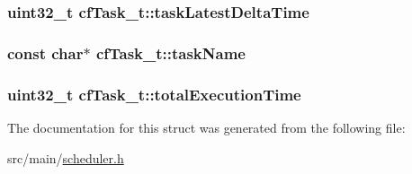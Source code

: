 \hypertarget{structcfTask__t_aa37e78e046bddb1e030d102f1d37579d}{
\subsubsection[{task\+Latest\+Delta\+Time}]{\setlength{\rightskip}{0pt plus 5cm}uint32\+\_\+t cf\+Task\+\_\+t\+::task\+Latest\+Delta\+Time}}\label{structcfTask__t_aa37e78e046bddb1e030d102f1d37579d}
\hypertarget{structcfTask__t_a0f0e06e267cdb51eb54ef10951694a4f}{
\subsubsection[{task\+Name}]{\setlength{\rightskip}{0pt plus 5cm}const char$\ast$ cf\+Task\+\_\+t\+::task\+Name}}\label{structcfTask__t_a0f0e06e267cdb51eb54ef10951694a4f}
\hypertarget{structcfTask__t_a32d0eb0495e2b66842d3987ef382fccb}{
\subsubsection[{total\+Execution\+Time}]{\setlength{\rightskip}{0pt plus 5cm}uint32\+\_\+t cf\+Task\+\_\+t\+::total\+Execution\+Time}}\label{structcfTask__t_a32d0eb0495e2b66842d3987ef382fccb}


The documentation for this struct was generated from the following file\+:\begin{DoxyCompactItemize}
\item 
src/main/\hyperlink{scheduler_8h}{scheduler.\+h}\end{DoxyCompactItemize}
